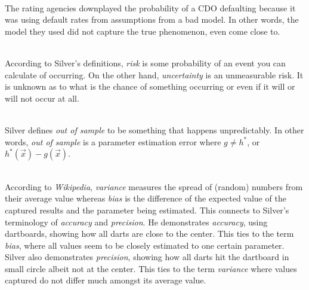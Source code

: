 \documentclass[12pt]{article}
\begin{document}
\begin{enumerate}
 \\
The rating agencies downplayed the probability of a CDO defaulting because it was using default rates from assumptions from a bad model. In other words, the model they used did not capture the true phenomenon, even come close to. 

 \\
According to Silver's definitions, \emph{risk} is some probability of an event you can calculate of occurring. On the other hand, \emph{uncertainty} is an unmeasurable risk. It is unknown as to what is the chance of something occurring or even if it will or will not occur at all. 

 \\
Silver defines \emph{out of sample} to be something that happens unpredictably. In other words, \emph{out of sample} is a parameter estimation error where $g \neq h^*$, or $h^*(\vec{x}) - g(\vec{x})$. 

 \\
According to \textit{Wikipedia}, \emph{variance} measures the spread of (random) numbers from their average value whereas \emph{bias} is the difference of the expected value of the captured results and the parameter being estimated. This connects to Silver's terminology of \emph{accuracy} and \emph{precision}. He demonstrates \emph{accuracy}, using dartboards, showing how all darts are close to the center. This ties to the term \emph{bias}, where all values seem to be closely estimated to one certain parameter. Silver also demonstrates \emph{precision}, showing how all darts hit the dartboard in small circle albeit not at the center. This ties to the term \emph{variance} where values captured do not differ much amongst its average value. 

\end{enumerate} \newpage
\end{document}
